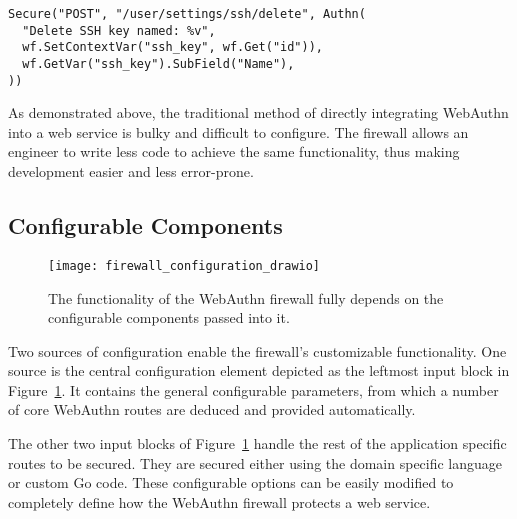 


\begin{lstlisting}[float=h]
Secure("POST", "/user/settings/ssh/delete", Authn(
  "Delete SSH key named: %v",
  wf.SetContextVar("ssh_key", wf.Get("id")),
  wf.GetVar("ssh_key").SubField("Name"),
))
\end{lstlisting}

As demonstrated above, the traditional method of directly integrating WebAuthn into a web service is bulky and difficult to configure. The firewall allows an engineer to write less code to achieve the same functionality, thus making development easier and less error-prone.




\subsection{Configurable Components}

\begin{figure}[h]
  \centering
  \texttt{[image: firewall\_configuration\_drawio]}
  \caption{The functionality of the WebAuthn firewall fully depends on the configurable components passed into it.}\label{Fig:ConfigurableComponents}
\end{figure}

Two sources of configuration enable the firewall's customizable functionality. One source is the central configuration element depicted as the leftmost input block in Figure~\ref{Fig:ConfigurableComponents}. It contains the general configurable parameters, from which a number of core WebAuthn routes are deduced and provided automatically.

The other two input blocks of Figure~\ref{Fig:ConfigurableComponents} handle the rest of the application specific routes to be secured. They are secured either using the domain specific language or custom Go code. These configurable options can be easily modified to completely define how the WebAuthn firewall protects a web service. 

